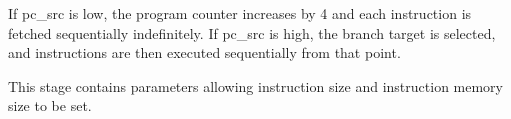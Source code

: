 \documentclass{article}
\newcommand{\Verilog}[3]{
  \lstset{language=Verilog}
  \lstset{backgroundcolor=\color{listinggray},rulecolor=\color{blue}}
  \lstset{linewidth=\textwidth}
  \lstset{commentstyle=\textit, stringstyle=\upshape,showspaces=false}
  \lstset{frame=tb}
  
}
\begin{document}
If pc\_src is low, the program counter increases by 4 and each instruction is fetched sequentially indefinitely. If pc\_src is high, the branch target is selected, and instructions are then executed sequentially from that point.

This stage contains parameters allowing instruction size and instruction memory size to be set. 

%
%
%
%
%
\end{document}
